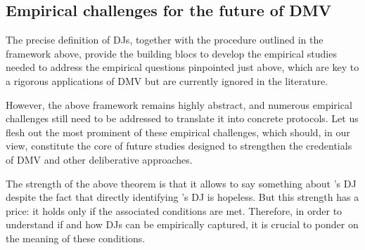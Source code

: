 \documentclass[version=3.21, pagesize, twoside=off, bibliography=totoc, DIV=calc, fontsize=12pt, a4paper, french, english]{scrartcl}
\begin{document}

\subsection{Empirical challenges for the future of \ac{DMV}}

The precise definition of \acp{DJ}, together with the procedure outlined in the framework above, provide the building blocs to develop the empirical studies needed to address the empirical questions pinpointed just above, which are key to a rigorous applications of \ac{DMV} but are currently ignored in the literature.


However, the above framework remains highly abstract, and numerous empirical challenges still need to be addressed to translate it into concrete protocols. Let us flesh out the most prominent of these empirical challenges, which should, in our view, constitute the core of future studies designed to strengthen the credentials of \ac{DMV} and other deliberative approaches. 

The strength of the above theorem is that it allows to say something about \thedm’s \ac{DJ} despite the fact that directly identifying \thedm’s \ac{DJ} is hopeless. 
But this strength has a price: it holds only if the associated conditions are met. 
Therefore, in order to understand if and how \acp{DJ} can be empirically captured, it is crucial to ponder on the meaning of these conditions.
\end{document}
